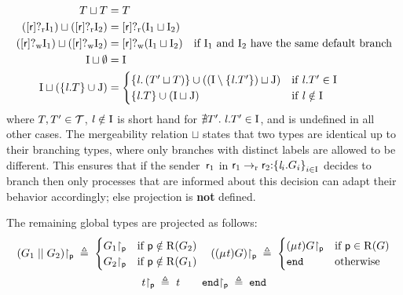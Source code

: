 \begin{align*}
	\LT \sqcup \LT &= \LT\\
	\left( \LBranR{\Role}{\indexSet_1} \right) \sqcup \left( \LBranR{\Role}{\indexSet_2} \right) &= \LBranR{\Role}{\left( \indexSet_1 \sqcup \indexSet_2 \right)}\\
	\left( \LBranW{\Role}{\indexSet_1} \right) \sqcup \left( \LBranW{\Role}{\indexSet_2} \right) &= \LBranW{\Role}{\left( \indexSet_1 \sqcup \indexSet_2 \right)} \quad \text{if } \indexSet_1 \text{ and } \indexSet_2 \text{ have the same default branch}\\
	\indexSet \sqcup \emptyset &= \indexSet\\
	\indexSet \sqcup \left( \Set{ \Label.\LT } \cup \indexSet[J] \right) &=
		\begin{cases}
			\Set{ \Label.\left( \LT' \sqcup \LT \right) } \cup \left( \left( \indexSet \setminus \Set{ \Label.\LT' } \right) \sqcup \indexSet[J] \right) & \text{if } \Label.\LT' \in \indexSet\\
			\Set{ \Label.\LT } \cup \left( \indexSet \sqcup \indexSet[J] \right) & \text{if } \Label \notin \indexSet
		\end{cases}
\end{align*}
where $ \LT, \LT' \in \localTypes $, $ \Label \notin \indexSet $ is short hand for $ \nexists \LT'\logdot \Label.\LT' \in \indexSet $, and is undefined in all other cases.
The mergeability relation $ \sqcup $ states that two types are identical up to their branching types, where only branches with distinct labels are allowed to be different.
This ensures that if the sender~$ \Role_1 $ in $ \GBranR{\Role_1}{\Role_2}{\Set{ \Label_i.\GT_i }_{i \in \indexSet}} $ decides to branch then only processes that are informed about this decision can adapt their behavior accordingly; else projection is \textbf{not} defined.

The remaining global types are projected as follows:
\[\begin{array}{c}
	\Proj{\left( \GPar{\GT_1}{\GT_2} \right)}{\Role[p]} \deff
		\begin{cases}
			\Proj{\GT_1}{\Role[p]} & \text{if } \Role[p] \notin \Roles{\GT_2}\\
			\Proj{\GT_2}{\Role[p]} & \text{if } \Role[p] \notin \Roles{\GT_1}
		\end{cases}
	\hspace{1em}
	\Proj{\left( \GRep{\TypeV}{\GT} \right)}{\Role[p]} \deff
		\begin{cases}
			\LRep{\TypeV}{\Proj{\GT}{\Role[p]}} & \text{if } \Role[p] \in \Roles{\GT}\\
			\LEnd & \text{otherwise}
		\end{cases} \vspace{0.5em}\\
	\Proj{\TypeV}{\Role[p]} \deff \TypeV
	\hspace{2em}
	\Proj{\GEnd}{\Role[p]} \deff \LEnd
\end{array}\]

